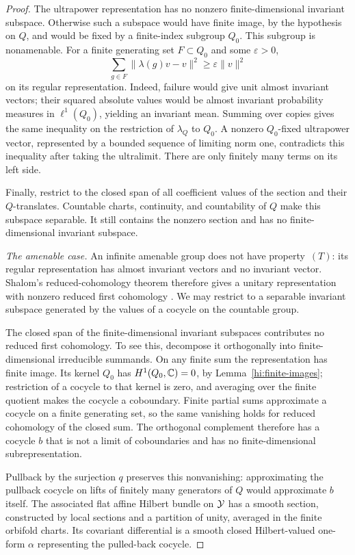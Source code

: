 \begin{proof}
The ultrapower representation has no nonzero finite-dimensional
invariant subspace. Otherwise such a subspace would have finite
image, by the hypothesis on \(Q\), and would be fixed by a
finite-index subgroup \(Q_0\). This subgroup is nonamenable.
For a finite generating set \(F\subset Q_0\) and some
\(\varepsilon>0\),
\[
 \sum_{g\in F}\|\lambda(g)v-v\|^2
 \ge\varepsilon\|v\|^2
\]
on its regular representation. Indeed, failure would give unit
almost invariant vectors; their squared absolute values would be
almost invariant probability measures in \(\ell^1(Q_0)\), yielding
an invariant mean. Summing over copies gives the same
inequality on the restriction of \(\lambda_Q\) to \(Q_0\).
A nonzero \(Q_0\)-fixed ultrapower vector, represented by a bounded
sequence of limiting norm one, contradicts this inequality after
taking the ultralimit. There are only finitely many terms on its
left side.

Finally, restrict to the closed span of all coefficient values of
the section and their \(Q\)-translates. Countable charts, continuity,
and countability of \(Q\) make this subspace separable. It still
contains the nonzero section and has no finite-dimensional invariant
subspace.

\medskip\noindent\emph{The amenable case.}
An infinite amenable group does not have property~\((T)\): its regular
representation has almost invariant vectors and no invariant vector.
Shalom's reduced-cohomology theorem therefore gives a unitary
representation with nonzero reduced first cohomology
\cite[Theorem~4.2]{Shalom2006}.
We may restrict to a separable invariant subspace generated by the
values of a cocycle on the countable group.

The closed span of the finite-dimensional invariant subspaces
contributes no reduced first cohomology. To see this, decompose it
orthogonally into finite-dimensional irreducible summands. On any
finite sum the representation has finite image. Its kernel \(Q_0\)
has \(H^1(Q_0,\mathbb C)=0\), by Lemma~\ref{hi:finite-images}; restriction of
a cocycle to that kernel is zero, and averaging over the finite
quotient makes the cocycle a coboundary. Finite partial sums
approximate a cocycle on a finite generating set, so the same
vanishing holds for reduced cohomology of the closed sum.
The orthogonal complement therefore has a cocycle \(b\) that is not
a limit of coboundaries and has no finite-dimensional subrepresentation.

Pullback by the surjection \(q\) preserves this nonvanishing:
approximating the pullback cocycle on lifts of finitely many
generators of \(Q\) would approximate \(b\) itself. The associated
flat affine Hilbert bundle on \(\mathcal Y\) has a smooth section, constructed
by local sections and a partition of unity, averaged in the finite
orbifold charts. Its covariant differential is a smooth closed
Hilbert-valued one-form \(\alpha\) representing the pulled-back
cocycle.


\end{proof}
